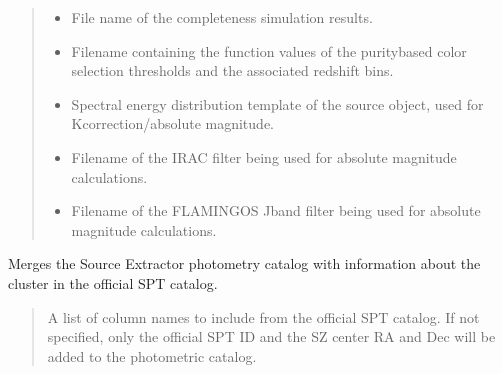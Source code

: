 \documentclass[letterpaper,12pt,english]{sphinxmanual}
\begin{document}
\begin{fulllineitems}
\begin{quote}
\begin{description}
\begin{itemize}
\item {} 
\sphinxAtStartPar
{} \textendash{} File name of the completeness simulation results.

\item {} 
\sphinxAtStartPar
{} \textendash{} Filename containing the function values of the purity\sphinxhyphen{}based color selection thresholds and the associated
redshift bins.

\item {} 
\sphinxAtStartPar
{} \textendash{} Spectral energy distribution template of the source object, used for K\sphinxhyphen{}correction/absolute magnitude.

\item {} 
\sphinxAtStartPar
{} \textendash{} Filename of the IRAC filter being used for absolute magnitude calculations.

\item {} 
\sphinxAtStartPar
{} \textendash{} Filename of the FLAMINGOS J\sphinxhyphen{}band filter being used for absolute magnitude calculations.

\end{itemize}

\end{description}\end{quote}

\begin{fulllineitems}
\label{\detokenize{api/selector:SPTclIRAGN.Pipeline_functions.SelectIRAGN.catalog_merge}}
\pysigstartsignatures
{}
\pysigstopsignatures
\sphinxAtStartPar
Merges the Source Extractor photometry catalog with information about the cluster in the official SPT catalog.
\begin{quote}\begin{description}
\sphinxAtStartPar
{} \textendash{} A list of column names to include from the official SPT catalog. If not specified, only the official SPT ID
and the SZ center RA and Dec will be added to the photometric catalog.


\end{description}
\end{quote}
\end{fulllineitems}
\end{fulllineitems}
\end{document}
